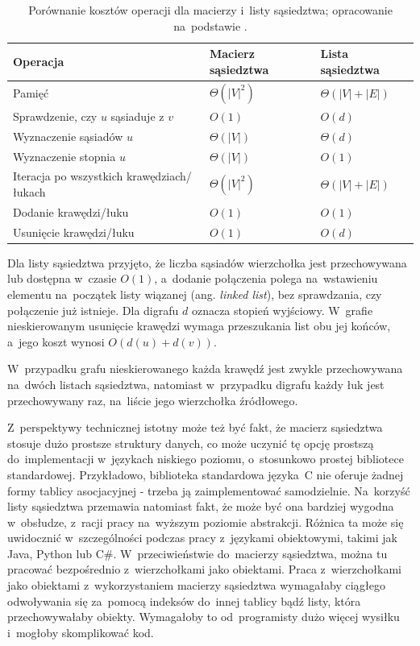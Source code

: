 \documentclass[11pt,a4paper,oneside]{report}
\begin{document}
\begin{table}[H]
  \centering
  \small
  \renewcommand{\arraystretch}{1.25}
  \begin{tabularx}{\textwidth}{@{}lXX@{}}
    \toprule
    \textbf{Operacja} & \textbf{Macierz sąsiedztwa} & \textbf{Lista sąsiedztwa} \\
    \midrule
    Pamięć & $\Theta(|V|^2)$ & $\Theta(|V|+|E|)$ \\
    Sprawdzenie, czy $u$ sąsiaduje z $v$ & $O(1)$ & $O(d)$ \\
    Wyznaczenie sąsiadów $u$ & $\Theta(|V|)$ & $\Theta(d)$ \\
    Wyznaczenie stopnia $u$ & $\Theta(|V|)$ & $O(1)$ \\
    Iteracja po wszystkich krawędziach/łukach & $\Theta(|V|^2)$ & $\Theta(|V|+|E|)$ \\
    Dodanie krawędzi/łuku & $O(1)$ & $O(1)$ \\
    Usunięcie krawędzi/łuku & $O(1)$ & $O(d)$ \\
    \bottomrule
  \end{tabularx}
  \caption{Porównanie kosztów operacji dla macierzy i~listy sąsiedztwa; opracowanie na~podstawie \cite{learngraphtheory-2026-graphrepresentation}.}
  \label{tab:porownanie-reprezentacji}
\end{table}

Dla listy sąsiedztwa przyjęto, że liczba sąsiadów wierzchołka jest przechowywana lub dostępna w~czasie $O(1)$, a~dodanie połączenia polega na~wstawieniu elementu na~początek listy wiązanej (ang. \textit{linked list}), bez sprawdzania, czy połączenie już istnieje. Dla digrafu $d$ oznacza stopień wyjściowy. W~grafie nieskierowanym usunięcie krawędzi wymaga przeszukania list obu jej końców, a~jego koszt wynosi $O(d(u)+d(v))$.

W~przypadku grafu nieskierowanego każda krawędź jest zwykle przechowywana na~dwóch listach sąsiedztwa, natomiast w~przypadku digrafu każdy łuk jest przechowywany raz, na~liście jego wierzchołka źródłowego.

Z~perspektywy technicznej istotny może też być fakt, że macierz sąsiedztwa stosuje dużo prostsze struktury danych, co może uczynić tę opcję prostszą do~implementacji w~językach niskiego poziomu, o~stosunkowo prostej bibliotece standardowej. Przykładowo, biblioteka standardowa języka~C nie oferuje żadnej formy tablicy asocjacyjnej - trzeba ją zaimplementować samodzielnie. Na~korzyść listy sąsiedztwa przemawia natomiast fakt, że może być ona bardziej wygodna w~obsłudze, z~racji pracy na~wyższym poziomie abstrakcji. Różnica ta może się uwidocznić w~szczególności podczas pracy z~językami obiektowymi, takimi jak Java, Python lub C\#. W~przeciwieństwie do~macierzy sąsiedztwa, można tu pracować bezpośrednio z~wierzchołkami jako obiektami. Praca z~wierzchołkami jako obiektami z~wykorzystaniem macierzy sąsiedztwa wymagałaby ciągłego odwoływania się za~pomocą indeksów do~innej tablicy bądź listy, która przechowywałaby obiekty. Wymagałoby to od~programisty dużo więcej wysiłku i~mogłoby skomplikować kod.
\end{document}
